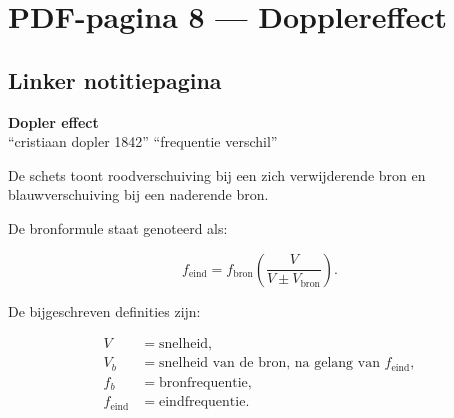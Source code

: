 \documentclass[11pt,a4paper]{article}
\newcommand{\photon}[3]{%
  \draw[#3,decorate,decoration={snake,amplitude=2pt,segment length=6pt},->,thick]
    (#1)--(#2);
}
\begin{document}
\newpage
\section*{PDF-pagina 8 --- Dopplereffect}

\subsection*{Linker notitiepagina}

\begin{center}
{\Large \textbf{Dopler effect}}\\
\small ``cristiaan dopler 1842'' \hspace{1.5em} ``frequentie verschil''
\end{center}

De schets toont roodverschuiving bij een zich verwijderende bron en
blauwverschuiving bij een naderende bron.

\begin{center}
\end{center}

De bronformule staat genoteerd als:

$$
f_{\mathrm{eind}}
=
f_{\mathrm{bron}}
\left(
\frac{V}{V\pm V_{\mathrm{bron}}}
\right).
$$

De bijgeschreven definities zijn:

\begin{align*}
V &={}\text{snelheid},\\
V_b &={}\text{snelheid van de bron, na gelang van }f_{\mathrm{eind}},\\
f_b &={}\text{bronfrequentie},\\
f_{\mathrm{eind}} &={}\text{eindfrequentie}.
\end{align*}
\end{document}

